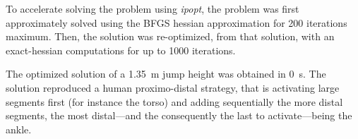 To accelerate solving the problem using \emph{ipopt}, the problem was first approximately solved using the BFGS hessian approximation for 200 iterations maximum.
Then, the solution was re-optimized, from that solution, with an exact-hessian computations for up to 1000 iterations.

The optimized solution of a \SI{1.35}{\meter} jump height was obtained in \SI{0}{\second}.
The solution reproduced a human proximo-distal strategy, that is activating large segments first (for instance the torso) and adding sequentially the more distal segments, the most distal---and the consequently the last to activate---being the ankle.

